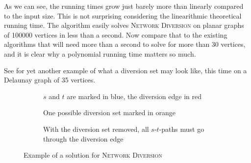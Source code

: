 \begin{center}
        
\end{center}

As we can see, the running times grow just barely more than linearly compared to the input size. This is not surprising considering the linearithmic theoretical running time. The algorithm easily solves \textsc{Network Diversion} on planar graphs of 100000 vertices in less than a second. Now compare that to the existing algorithms that will need more than a second to solve for more than 30 vertices, and it is clear why a polynomial running time matters so much.

See  for yet another example of what a diversion set may look like, this time on a Delaunay graph of 35 vertices.

\noindent
\begin{figure}
    \centering
    \begin{subfigure}{.32\textwidth}
        \centering
        
        \caption{$s$ and $t$ are marked in blue, the diversion edge in red}
        \label{subfigure:network-diversion-input}
    \end{subfigure}\hfill%
    \begin{subfigure}{.32\textwidth}
        \centering
        
        \caption{One possible diversion set marked in orange}
        \label{subfigure:network-diversion-diversion}
    \end{subfigure}\hfill%
    \begin{subfigure}{.32\textwidth}
        \centering
        
        \caption{With the diversion set removed, all $s$-$t$-paths must go through the diversion edge}
        \label{subfigure:network-diversion-diverted}
    \end{subfigure}\hfill%
    \caption{Example of a solution for \textsc{Network Diversion}}
    \label{figure:network-diversion-on-delaunay}
\end{figure}
